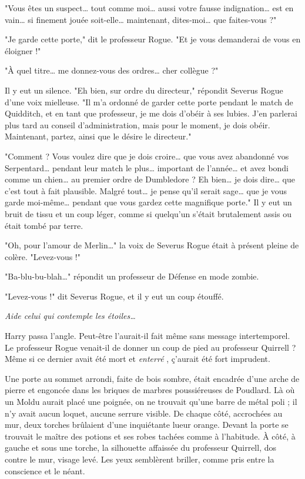 "Vous êtes un suspect… tout comme moi… aussi votre fausse indignation… est en vain… si finement jouée soit-elle… maintenant, dites-moi… que faites-vous ?"

"Je garde cette porte," dit le professeur Rogue. "Et je vous demanderai de vous en éloigner !"

"À quel titre… me donnez-vous des ordres… cher collègue ?"

Il y eut un silence. "Eh bien, sur ordre du directeur," répondit Severus Rogue d'une voix mielleuse. "Il m'a ordonné de garder cette porte pendant le match de Quidditch, et en tant que professeur, je me dois d'obéir à ses lubies. J'en parlerai plus tard au conseil d'administration, mais pour le moment, je dois obéir. Maintenant, partez, ainsi que le désire le directeur."

"Comment ? Vous voulez dire que je dois croire… que vous avez abandonné vos Serpentard… pendant leur match le plus… important de l'année… et avez bondi comme un chien… au premier ordre de Dumbledore ? Eh bien… je dois dire… que c'est tout à fait plausible. Malgré tout… je pense qu'il serait sage… que je vous garde moi-même… pendant que vous gardez cette magnifique porte." Il y eut un bruit de tissu et un coup léger, comme si quelqu'un s'était brutalement assis ou était tombé par terre.

"Oh, pour l'amour de Merlin…" la voix de Severus Rogue était à présent pleine de colère. "Levez-vous !"

"Ba-blu-bu-blah…" répondit un professeur de Défense en mode zombie.

"Levez-vous !" dit Severus Rogue, et il y eut un coup étouffé.

\emph{Aide celui qui contemple les étoiles…} 

Harry passa l'angle. Peut-être l'aurait-il fait même sans message intertemporel. Le professeur Rogue venait-il de donner un coup de pied au professeur Quirrell ? Même si ce dernier avait été mort et \emph{enterré} , ç'aurait été fort imprudent.

Une porte au sommet arrondi, faite de bois sombre, était encadrée d'une arche de pierre et engoncée dans les briques de marbres poussiéreuses de Poudlard. Là où un Moldu aurait placé une poignée, on ne trouvait qu'une barre de métal poli ; il n'y avait aucun loquet, aucune serrure visible. De chaque côté, accrochées au mur, deux torches brûlaient d'une inquiétante lueur orange. Devant la porte se trouvait le maître des potions et ses robes tachées comme à l'habitude. À côté, à gauche et sous une torche, la silhouette affaissée du professeur Quirrell, dos contre le mur, visage levé. Les yeux semblèrent briller, comme pris entre la conscience et le néant.

